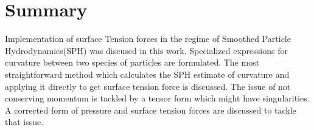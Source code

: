 \documentclass[oneside]{iitbreport}
\begin{document}


 

           


                    

\figurespagefalse
\tablespagefalse
\makecontents %


\cleardoublepage
\setcounter{page}{1}






\chapter{Summary}
Implementation of surface Tension forces in the regime of Smoothed Particle Hydrodynamics(SPH) was discused in this work. Specialized expressions for curvature between two species of particles are formulated. The most straightforward method which calculates the SPH estimate of curvature and applying it directly to get surface tension force is discussed. The issue of not conserving momentum is tackled by a tensor form which might have singularities. A corrected form of pressure and surface tension forces are discussed to tackle that issue.
\end{document}
